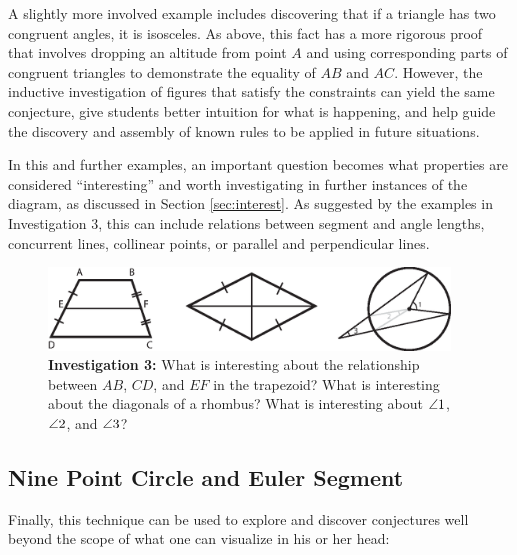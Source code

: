 A slightly more involved example includes discovering that if a
triangle has two congruent angles, it is isosceles.  As above, this
fact has a more rigorous proof that involves dropping an altitude from
point $A$ and using corresponding parts of congruent triangles to
demonstrate the equality of $AB$ and $AC$.  However, the inductive
investigation of figures that satisfy the constraints can yield the
same conjecture, give students better intuition for what is happening,
and help guide the discovery and assembly of known rules to be applied
in future situations.

In this and further examples, an important question becomes what
properties are considered ``interesting'' and worth investigating in
further instances of the diagram, as discussed in Section
\ref{sec:interest}.  As suggested by the examples in Investigation 3,
this can include relations between segment and angle lengths,
concurrent lines, collinear points, or parallel and perpendicular
lines.

\begin{figure}[h!]
\centering
\includegraphics[width=0.95\textwidth]{diagrams/extra-diagrams.eps}
\captionsetup{labelformat=empty}
\caption{{\bf Investigation 3:} What is interesting about the
  relationship between $AB$, $CD$, and $EF$ in the trapezoid? What is
  interesting about the diagonals of a rhombus? What is interesting
  about $\protect\angle 1$, $\protect\angle 2$, and $\protect\angle 3$?}
\end{figure}

\subsection{Nine Point Circle and Euler Segment}

Finally, this technique can be used to explore and discover
conjectures well beyond the scope of what one can visualize in his or
her head:

